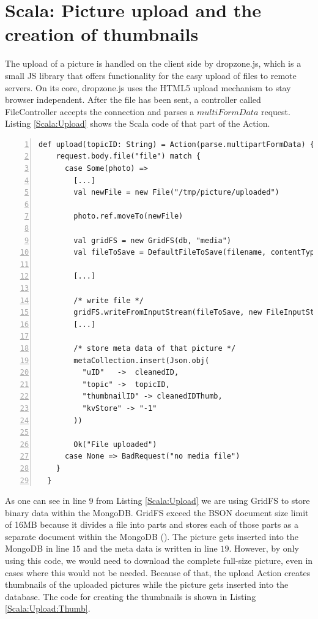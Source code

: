 \section{Scala: Picture upload and the creation of thumbnails}
The upload of a picture is handled on the client side by dropzone.js, which is a small \ac{JS} library that offers functionality for the easy upload of files to remote servers. On its core, dropzone.js uses the \ac{HTML5} upload mechanism to stay browser independent. After the file has been sent, a controller called FileController accepts the connection and parses a $multiFormData$ request. Listing \ref{Scala:Upload} shows the Scala code of that part of the Action.

\begin{lstlisting}[numbers=left,caption={Snippet of the upload Action of the FileController for uploading pictures.},label=Scala:Upload,frame=tlbr,breaklines]
def upload(topicID: String) = Action(parse.multipartFormData) { request =>
    request.body.file("file") match {
      case Some(photo) =>
        [...]
        val newFile = new File("/tmp/picture/uploaded")

        photo.ref.moveTo(newFile)

        val gridFS = new GridFS(db, "media")
        val fileToSave = DefaultFileToSave(filename, contentType)

        [...]

        /* write file */
        gridFS.writeFromInputStream(fileToSave, new FileInputStream(newFile))
        [...]

        /* store meta data of that picture */
        metaCollection.insert(Json.obj(
          "uID"   ->  cleanedID,
          "topic" ->  topicID,
          "thumbnailID" -> cleanedIDThumb,
          "kvStore" -> "-1"
        ))

        Ok("File uploaded")
      case None => BadRequest("no media file")
    }
  }
\end{lstlisting}

As one can see in line $9$ from Listing \ref{Scala:Upload} we are using GridFS to store binary data within the MongoDB. GridFS exceed the \ac{BSON} document size limit of 16MB because it divides a file into parts and stores each of those parts as a separate document within the MongoDB (\cite{gridfs}). The picture gets inserted into the MongoDB in line $15$ and the meta data is written in line $19$. However, by only using this code, we would need to download the complete full-size picture, even in cases where this would not be needed.  Because of that, the upload Action creates thumbnails of the uploaded pictures while the picture gets inserted into the database. The code for creating the thumbnails is shown in Listing \ref{Scala:Upload:Thumb}.

